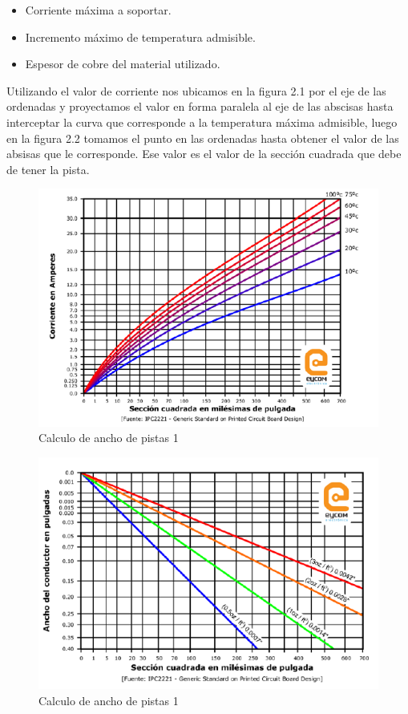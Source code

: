\begin{itemize} 
\item Corriente máxima a soportar.
\item Incremento máximo de temperatura admisible.
\item Espesor de cobre del material utilizado.
\end{itemize}
Utilizando el valor de corriente nos ubicamos en la figura 2.1 por el eje de las ordenadas y proyectamos el valor en forma paralela al eje de las abscisas hasta interceptar la curva que corresponde a la temperatura máxima admisible, luego en la figura 2.2 tomamos el punto en las ordenadas hasta obtener el valor de las absisas que le corresponde. Ese valor es el valor de la sección cuadrada que debe de tener la pista.

\begin{figure}[H]
\centering
\includegraphics[width=12cm]{capitulo2/figs/figura1.png}
\caption{Calculo de ancho de pistas 1}
\end{figure}

\begin{figure}[H]
\centering
\includegraphics[width=12cm]{capitulo2/figs/figura2.png}
\caption{Calculo de ancho de pistas 1}
\end{figure}


